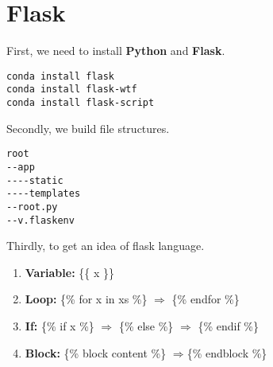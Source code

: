 \newpage
\section{Flask}
First, we need to install \textbf{Python} and \textbf{Flask}. \par
\begin{lstlisting}
conda install flask 
conda install flask-wtf 
conda install flask-script 
\end{lstlisting}
Secondly, we build file structures. \par
\begin{lstlisting}
root
--app
----static
----templates
--root.py
--v.flaskenv
\end{lstlisting}
Thirdly, to get an idea of flask language. \par 
\begin{enumerate}[(1)]
    \item \textbf{Variable:} \{\{ x \}\}
    \item \textbf{Loop:} \{\% for x in xs \%\} $\Longrightarrow$ \{\% endfor \%\}
    \item \textbf{If:} \{\% if x \%\} $\Longrightarrow$ \{\% else \%\} $\Longrightarrow$ \{\% endif \%\}
    \item \textbf{Block:} \{\% block content \%\} $\Longrightarrow$\{\% endblock \%\}
\end{enumerate}